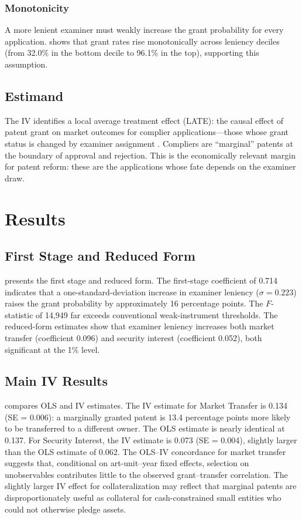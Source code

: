 \documentclass[12pt]{article}
\begin{document}
\subsubsection*{Monotonicity} A more lenient examiner must weakly increase the grant probability for every application.  shows that grant rates rise monotonically across leniency deciles (from 32.0\% in the bottom decile to 96.1\% in the top), supporting this assumption.

\subsection{Estimand}

The IV identifies a local average treatment effect (LATE): the causal effect of patent grant on market outcomes for complier applications---those whose grant status is changed by examiner assignment \citep{imbens1994identification, angrist1996identification}. Compliers are ``marginal'' patents at the boundary of approval and rejection. This is the economically relevant margin for patent reform: these are the applications whose fate depends on the examiner draw.


\section{Results}
\label{sec:results}

\subsection{First Stage and Reduced Form}

 presents the first stage and reduced form. The first-stage coefficient of 0.714 indicates that a one-standard-deviation increase in examiner leniency ($\sigma = 0.223$) raises the grant probability by approximately 16 percentage points. The $F$-statistic of 14,949 far exceeds conventional weak-instrument thresholds. The reduced-form estimates show that examiner leniency increases both market transfer (coefficient 0.096) and security interest (coefficient 0.052), both significant at the 1\% level.



\subsection{Main IV Results}

 compares OLS and IV estimates. The IV estimate for Market Transfer is 0.134 (SE = 0.006): a marginally granted patent is 13.4 percentage points more likely to be transferred to a different owner. The OLS estimate is nearly identical at 0.137. For Security Interest, the IV estimate is 0.073 (SE = 0.004), slightly larger than the OLS estimate of 0.062. The OLS--IV concordance for market transfer suggests that, conditional on art-unit--year fixed effects, selection on unobservables contributes little to the observed grant--transfer correlation. The slightly larger IV effect for collateralization may reflect that marginal patents are disproportionately useful as collateral for cash-constrained small entities who could not otherwise pledge assets.
\end{document}
